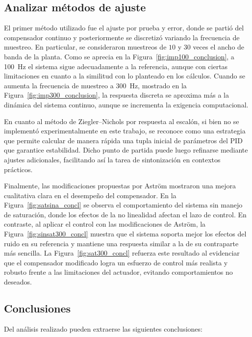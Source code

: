 \clearpage
\twocolumn
\subsection{Analizar métodos de ajuste}
El primer método utilizado fue el ajuste por prueba y error, donde se partió del compensador continuo y posteriormente se discretizó variando la frecuencia de muestreo. En particular, se consideraron muestreos de \(10\) y \(30\) veces el ancho de banda de la planta. Como se aprecia en la Figura~\ref{fig:imp100_conclusion}, a \SI{100}{\hertz} el sistema sigue adecuadamente a la referencia, aunque con ciertas limitaciones en cuanto a la similitud con lo planteado en los cálculos. Cuando se aumenta la frecuencia de muestreo a \SI{300}{\hertz}, mostrado en la Figura~\ref{fig:imp300_conclusion}, la respuesta discreta se aproxima más a la dinámica del sistema continuo, aunque se incrementa la exigencia computacional.

En cuanto al método de Ziegler--Nichols por respuesta al escalón, si bien no se implementó experimentalmente en este trabajo, se reconoce como una estrategia que permite calcular de manera rápida una tupla inicial de parámetros del PID que garantice estabilidad. Dicho punto de partida puede luego refinarse mediante ajustes adicionales, facilitando así la tarea de sintonización en contextos prácticos.

Finalmente, las modificaciones propuestas por Astr\"om mostraron una mejora cualitativa clara en el desempeño del compensador. En la Figura~\ref{fig:satsina_concl} se observa el comportamiento del sistema sin manejo de saturación, donde los efectos de la no linealidad afectan el lazo de control. En contraste, al aplicar el control con las modificaciones de Astr\"om, la Figura~\ref{fig:sinsat300_concl} muestra que el sistema soporta mejor los efectos del ruido en su referencia y mantiene una respuesta similar a la de su contraparte más sencilla. La Figura~\ref{fig:sat300_concl} refuerza este resultado al evidenciar que el compensador modificado logra un esfuerzo de control más realista y robusto frente a las limitaciones del actuador, evitando comportamientos no deseados.




\subsection{Conclusiones}

Del análisis realizado pueden extraerse las siguientes conclusiones:

